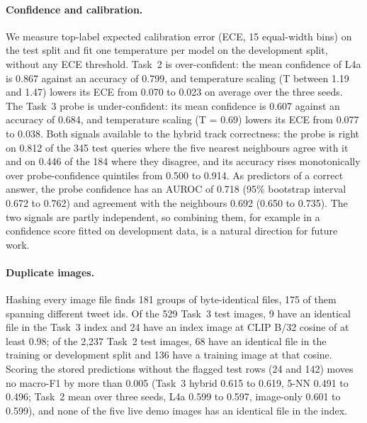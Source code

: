 \paragraph{Confidence and calibration.}
We measure top-label expected calibration error (ECE, 15 equal-width bins) on the test split and fit one temperature per model on the development split, without any ECE threshold.
Task~2 is over-confident: the mean confidence of L4a is 0.867 against an accuracy of 0.799, and temperature scaling (T between 1.19 and 1.47) lowers its ECE from 0.070 to 0.023 on average over the three seeds.
The Task~3 probe is under-confident: its mean confidence is 0.607 against an accuracy of 0.684, and temperature scaling (T = 0.69) lowers its ECE from 0.077 to 0.038.
Both signals available to the hybrid track correctness: the probe is right on 0.812 of the 345 test queries where the five nearest neighbours agree with it and on 0.446 of the 184 where they disagree, and its accuracy rises monotonically over probe-confidence quintiles from 0.500 to 0.914.
As predictors of a correct answer, the probe confidence has an AUROC of 0.718 (95\% bootstrap interval 0.672 to 0.762) and agreement with the neighbours 0.692 (0.650 to 0.735).
The two signals are partly independent, so combining them, for example in a confidence score fitted on development data, is a natural direction for future work.
\paragraph{Duplicate images.}
Hashing every image file finds 181 groups of byte-identical files, 175 of them spanning different tweet ids.
Of the 529 Task~3 test images, 9 have an identical file in the Task~3 index and 24 have an index image at CLIP B/32 cosine of at least 0.98; of the 2,237 Task~2 test images, 68 have an identical file in the training or development split and 136 have a training image at that cosine.
Scoring the stored predictions without the flagged test rows (24 and 142) moves no macro-F1 by more than 0.005 (Task~3 hybrid 0.615 to 0.619, 5-NN 0.491 to 0.496; Task~2 mean over three seeds, L4a 0.599 to 0.597, image-only 0.601 to 0.599), and none of the five live demo images has an identical file in the index.

